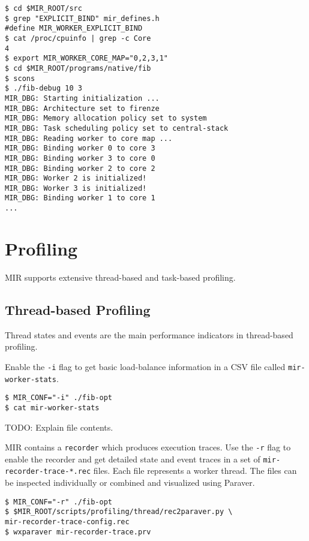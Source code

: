 \documentclass[11pt,a4paper]{article}
\begin{document}
\begin{lstlisting}[style=MyInputStyle]
$ cd $MIR_ROOT/src
$ grep "EXPLICIT_BIND" mir_defines.h
#define MIR_WORKER_EXPLICIT_BIND
$ cat /proc/cpuinfo | grep -c Core
4
$ export MIR_WORKER_CORE_MAP="0,2,3,1"
$ cd $MIR_ROOT/programs/native/fib
$ scons 
$ ./fib-debug 10 3
MIR_DBG: Starting initialization ...
MIR_DBG: Architecture set to firenze
MIR_DBG: Memory allocation policy set to system
MIR_DBG: Task scheduling policy set to central-stack
MIR_DBG: Reading worker to core map ...
MIR_DBG: Binding worker 0 to core 3
MIR_DBG: Binding worker 3 to core 0
MIR_DBG: Binding worker 2 to core 2
MIR_DBG: Worker 2 is initialized!
MIR_DBG: Worker 3 is initialized!
MIR_DBG: Binding worker 1 to core 1
...
\end{lstlisting}

\section{Profiling}\label{profiling}

MIR supports extensive thread-based and task-based profiling.

\subsection{Thread-based Profiling}\label{thread-based-profiling}

Thread states and events are the main performance indicators in thread-based profiling.

Enable the \lstinline!-i! flag to get basic load-balance information in a CSV file called \lstinline!mir-worker-stats!.

\begin{lstlisting}[style=MyInputStyle]
$ MIR_CONF="-i" ./fib-opt
$ cat mir-worker-stats
\end{lstlisting}

TODO: Explain file contents.

MIR contains a \lstinline!recorder! which produces execution traces. Use the \lstinline!-r! flag to enable the recorder and get detailed state and event traces in a set of \lstinline!mir-recorder-trace-*.rec! files.  Each file represents a worker thread. The files can be inspected individually or combined and visualized using Paraver.

\begin{lstlisting}[style=MyInputStyle]
$ MIR_CONF="-r" ./fib-opt
$ $MIR_ROOT/scripts/profiling/thread/rec2paraver.py \
mir-recorder-trace-config.rec 
$ wxparaver mir-recorder-trace.prv
\end{lstlisting}
\end{document}

